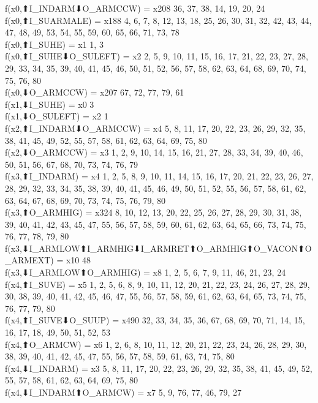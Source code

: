 f(x0,⬆I_INDARM⬇O_ARMCCW) = x208 {36, 37, 38, 14, 19, 20, 24} \\
f(x0,⬆I_SUARMALE) = x188 {4, 6, 7, 8, 12, 13, 18, 25, 26, 30, 31, 32, 42, 43, 44, 47, 48, 49, 53, 54, 55, 59, 60, 65, 66, 71, 73, 78} \\
f(x0,⬆I_SUHE) = x1 {1, 3} \\
f(x0,⬆I_SUHE⬇O_SULEFT) = x2 {2, 5, 9, 10, 11, 15, 16, 17, 21, 22, 23, 27, 28, 29, 33, 34, 35, 39, 40, 41, 45, 46, 50, 51, 52, 56, 57, 58, 62, 63, 64, 68, 69, 70, 74, 75, 76, 80} \\
f(x0,⬇O_ARMCCW) = x207 {67, 72, 77, 79, 61} \\
f(x1,⬇I_SUHE) = x0 {3} \\
f(x1,⬇O_SULEFT) = x2 {1} \\
f(x2,⬆I_INDARM⬇O_ARMCCW) = x4 {5, 8, 11, 17, 20, 22, 23, 26, 29, 32, 35, 38, 41, 45, 49, 52, 55, 57, 58, 61, 62, 63, 64, 69, 75, 80} \\
f(x2,⬇O_ARMCCW) = x3 {1, 2, 9, 10, 14, 15, 16, 21, 27, 28, 33, 34, 39, 40, 46, 50, 51, 56, 67, 68, 70, 73, 74, 76, 79} \\
f(x3,⬆I_INDARM) = x4 {1, 2, 5, 8, 9, 10, 11, 14, 15, 16, 17, 20, 21, 22, 23, 26, 27, 28, 29, 32, 33, 34, 35, 38, 39, 40, 41, 45, 46, 49, 50, 51, 52, 55, 56, 57, 58, 61, 62, 63, 64, 67, 68, 69, 70, 73, 74, 75, 76, 79, 80} \\
f(x3,⬆O_ARMHIG) = x324 {8, 10, 12, 13, 20, 22, 25, 26, 27, 28, 29, 30, 31, 38, 39, 40, 41, 42, 43, 45, 47, 55, 56, 57, 58, 59, 60, 61, 62, 63, 64, 65, 66, 73, 74, 75, 76, 77, 78, 79, 80} \\
f(x3,⬇I_ARMLOW⬆I_ARMHIG⬇I_ARMRET⬆O_ARMHIG⬆O_VACON⬆O_ARMEXT) = x10 {48} \\
f(x3,⬇I_ARMLOW⬆O_ARMHIG) = x8 {1, 2, 5, 6, 7, 9, 11, 46, 21, 23, 24} \\
f(x4,⬆I_SUVE) = x5 {1, 2, 5, 6, 8, 9, 10, 11, 12, 20, 21, 22, 23, 24, 26, 27, 28, 29, 30, 38, 39, 40, 41, 42, 45, 46, 47, 55, 56, 57, 58, 59, 61, 62, 63, 64, 65, 73, 74, 75, 76, 77, 79, 80} \\
f(x4,⬆I_SUVE⬇O_SUUP) = x490 {32, 33, 34, 35, 36, 67, 68, 69, 70, 71, 14, 15, 16, 17, 18, 49, 50, 51, 52, 53} \\
f(x4,⬆O_ARMCW) = x6 {1, 2, 6, 8, 10, 11, 12, 20, 21, 22, 23, 24, 26, 28, 29, 30, 38, 39, 40, 41, 42, 45, 47, 55, 56, 57, 58, 59, 61, 63, 74, 75, 80} \\
f(x4,⬇I_INDARM) = x3 {5, 8, 11, 17, 20, 22, 23, 26, 29, 32, 35, 38, 41, 45, 49, 52, 55, 57, 58, 61, 62, 63, 64, 69, 75, 80} \\
f(x4,⬇I_INDARM⬆O_ARMCW) = x7 {5, 9, 76, 77, 46, 79, 27} \\
